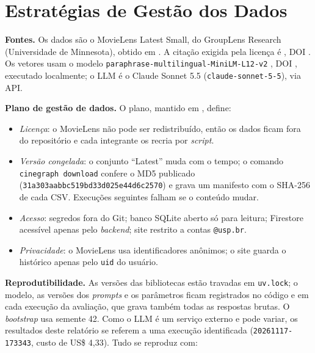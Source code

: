 \documentclass[11pt,a4paper]{article}
\newcommand{\code}[1]{\texttt{#1}}
\begin{document}
\section{Estratégias de Gestão dos Dados}

\textbf{Fontes.} Os dados são o MovieLens Latest Small, do GroupLens Research
(Universidade de Minnesota), obtido em
. A citação exigida
pela licença é , DOI
\href{https://doi.org/10.1145/2827872}{}. Os vetores usam o modelo
\code{paraphrase-multilingual-\allowbreak MiniLM-L12-v2} \cite{reimers2020multilingual}, DOI
\href{https://doi.org/10.18653/v1/2020.emnlp-main.365}{},
executado localmente; o LLM é o Claude Sonnet 5.5 (\code{claude-sonnet-5-5}), via API.

\textbf{Plano de gestão de dados.} O plano, mantido em , define:
\begin{itemize}
  \item \emph{Licença}: o MovieLens não pode ser redistribuído, então os dados ficam fora do
        repositório e cada integrante os recria por \emph{script}.
  \item \emph{Versão congelada}: o conjunto \enquote{Latest} muda com o tempo; o comando
        \code{cinegraph download} confere o MD5 publicado
        (\code{31a303aabbc519bd33d025e44d6c2570}) e grava um manifesto com o SHA-256 de
        cada CSV. Execuções seguintes falham se o conteúdo mudar.
  \item \emph{Acesso}: segredos fora do Git; banco SQLite aberto só para leitura; Firestore
        acessível apenas pelo \emph{backend}; site restrito a contas \code{@usp.br}.
  \item \emph{Privacidade}: o MovieLens usa identificadores anônimos; o site guarda o
        histórico apenas pelo \code{uid} do usuário.
\end{itemize}

\textbf{Reprodutibilidade.} As versões das bibliotecas estão travadas em \code{uv.lock}; o
modelo, as versões dos \emph{prompts} e os parâmetros ficam registrados no código e em cada
execução da avaliação, que grava também todas as respostas brutas. O \emph{bootstrap} usa
semente 42. Como o LLM é um serviço externo e pode variar, os resultados deste relatório se
referem a uma execução identificada (\code{20261117-173343}, custo de US\$ 4,33). Tudo se
reproduz com:
\end{document}
